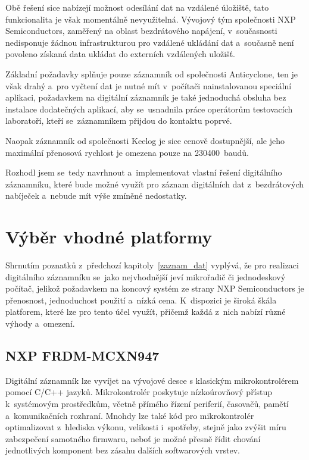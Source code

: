 Obě řešení sice nabízejí možnost odesílání dat na vzdálené úložiště, tato funkcionalita je však momentálně nevyužitelná. Vývojový tým společnosti NXP Semiconductors, zaměřený na oblast bezdrátového napájení, v~současnosti nedisponuje žádnou infrastrukturou pro vzdálené ukládání dat a~současně není povoleno získaná data ukládat do externích vzdálených uložišť.

Základní požadavky splňuje pouze záznamník od společnosti Anticyclone, ten je však drahý a~pro vyčtení dat je nutné mít v~počítači nainstalovanou speciální aplikaci, požadavkem na digitální záznamník je také jednoduchá obsluha bez instalace dodatečných aplikací, aby se~usnadnila práce operátorům testovacích laboratoří, kteří se~záznamníkem přijdou do kontaktu poprvé. 

Naopak záznamník od společnosti Keelog je sice cenově dostupnější, ale jeho maximální přenosová rychlost je omezena pouze na 230400~baudů.

Rozhodl jsem se~tedy navrhnout a~implementovat vlastní řešení digitálního záznamníku, které bude možné využít pro záznam digitálních dat z~bezdrátových nabíječek a~nebude mít výše zmíněné nedostatky.

\section{Výběr vhodné platformy}
\label{vyber_vhodne_platformy}
Shrnutím poznatků z~předchozí kapitoly~\ref{zaznam_dat} vyplývá, že pro realizaci digitálního záznamníku se~jako nejvhodnější jeví mikrořadič či jednodeskový počítač, jelikož požadavkem na koncový systém ze strany NXP Semiconductors je přenosnost, jednoduchost použití a~nízká cena. K~dispozici je široká škála platforem, které lze pro tento účel využít, přičemž každá z~nich nabízí různé výhody a~omezení.

\subsection{NXP FRDM-MCXN947}
\label{nxp_frdm_mcxn947}
Digitální záznamník lze vyvíjet na vývojové desce s klasickým mikrokontrolérem pomocí C/C++ jazyků. Mikrokontrolér poskytuje nízkoúrovňový přístup k~systémovým prostředkům, včetně přímého řízení periferií, časovačů, pamětí a~komunikačních rozhraní. Mnohdy lze také kód pro mikrokontrolér optimalizovat z~hlediska výkonu, velikosti i~spotřeby, stejně jako zvýšit míru zabezpečení samotného firmwaru, neboť je možné přesně řídit chování jednotlivých komponent bez zásahu dalších softwarových vrstev.

